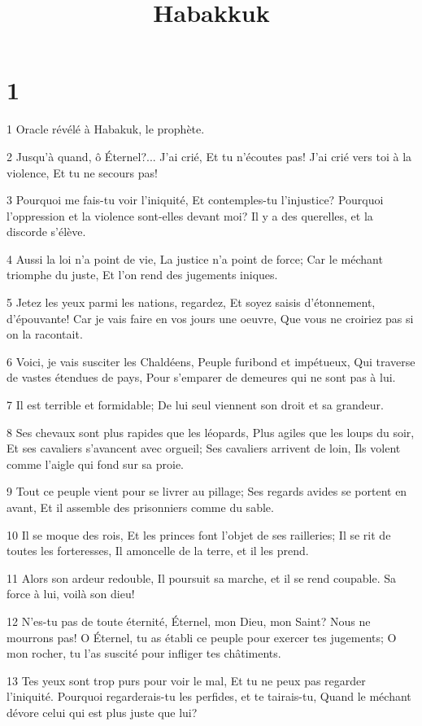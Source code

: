 

\title{Habakkuk}


\chapter{1}

\par 1 Oracle révélé à Habakuk, le prophète.
\par 2 Jusqu'à quand, ô Éternel?... J'ai crié, Et tu n'écoutes pas! J'ai crié vers toi à la violence, Et tu ne secours pas!
\par 3 Pourquoi me fais-tu voir l'iniquité, Et contemples-tu l'injustice? Pourquoi l'oppression et la violence sont-elles devant moi? Il y a des querelles, et la discorde s'élève.
\par 4 Aussi la loi n'a point de vie, La justice n'a point de force; Car le méchant triomphe du juste, Et l'on rend des jugements iniques.
\par 5 Jetez les yeux parmi les nations, regardez, Et soyez saisis d'étonnement, d'épouvante! Car je vais faire en vos jours une oeuvre, Que vous ne croiriez pas si on la racontait.
\par 6 Voici, je vais susciter les Chaldéens, Peuple furibond et impétueux, Qui traverse de vastes étendues de pays, Pour s'emparer de demeures qui ne sont pas à lui.
\par 7 Il est terrible et formidable; De lui seul viennent son droit et sa grandeur.
\par 8 Ses chevaux sont plus rapides que les léopards, Plus agiles que les loups du soir, Et ses cavaliers s'avancent avec orgueil; Ses cavaliers arrivent de loin, Ils volent comme l'aigle qui fond sur sa proie.
\par 9 Tout ce peuple vient pour se livrer au pillage; Ses regards avides se portent en avant, Et il assemble des prisonniers comme du sable.
\par 10 Il se moque des rois, Et les princes font l'objet de ses railleries; Il se rit de toutes les forteresses, Il amoncelle de la terre, et il les prend.
\par 11 Alors son ardeur redouble, Il poursuit sa marche, et il se rend coupable. Sa force à lui, voilà son dieu!
\par 12 N'es-tu pas de toute éternité, Éternel, mon Dieu, mon Saint? Nous ne mourrons pas! O Éternel, tu as établi ce peuple pour exercer tes jugements; O mon rocher, tu l'as suscité pour infliger tes châtiments.
\par 13 Tes yeux sont trop purs pour voir le mal, Et tu ne peux pas regarder l'iniquité. Pourquoi regarderais-tu les perfides, et te tairais-tu, Quand le méchant dévore celui qui est plus juste que lui?
